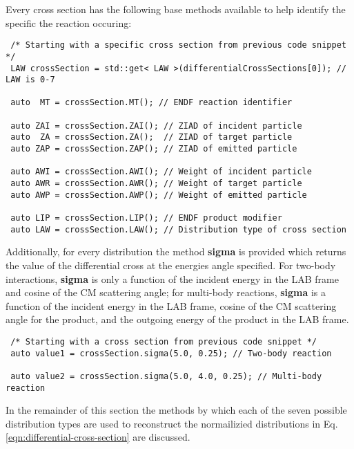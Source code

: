 \documentclass[../main.tex]{subfiles}
\begin{document}
Every cross section has the following base methods available to help identify the specific the reaction occuring:
\begin{verbatim}
 /* Starting with a specific cross section from previous code snippet */
 LAW crossSection = std::get< LAW >(differentialCrossSections[0]); // LAW is 0-7
 
 auto  MT = crossSection.MT(); // ENDF reaction identifier

 auto ZAI = crossSection.ZAI(); // ZIAD of incident particle
 auto  ZA = crossSection.ZA();  // ZIAD of target particle 
 auto ZAP = crossSection.ZAP(); // ZIAD of emitted particle

 auto AWI = crossSection.AWI(); // Weight of incident particle
 auto AWR = crossSection.AWR(); // Weight of target particle
 auto AWP = crossSection.AWP(); // Weight of emitted particle
  
 auto LIP = crossSection.LIP(); // ENDF product modifier
 auto LAW = crossSection.LAW(); // Distribution type of cross section
\end{verbatim}

Additionally, for every distribution the method \textbf{sigma} is provided which returns the value of the differential cross at the energies angle specified. For two-body interactions, \textbf{sigma} is only a function of the incident energy in the LAB frame and cosine of the CM scattering angle; for multi-body reactions, \textbf{sigma} is a function of the incident energy in the LAB frame, cosine of the CM scattering angle for the product, and the outgoing energy of the product in the LAB frame.
\begin{verbatim}
 /* Starting with a cross section from previous code snippet */
 auto value1 = crossSection.sigma(5.0, 0.25); // Two-body reaction
 
 auto value2 = crossSection.sigma(5.0, 4.0, 0.25); // Multi-body reaction
\end{verbatim}
In the remainder of this section the methods by which each of the seven possible distribution types are used to reconstruct the normailizied distributions in Eq. \eqref{eqn:differential-cross-section} are discussed. 

\end{document}
